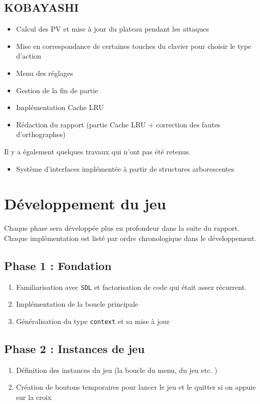 \documentclass{article}
\begin{document}
\subsection{KOBAYASHI}
\begin{itemize}
    \item Calcul des PV et mise à jour du plateau pendant les attaques 
    \item Mise en correspondance de certaines touches du clavier pour choisir le type d'action
    \item Menu des réglages 
    \item Gestion de la fin de partie
    \item Implémentation Cache LRU 
    \item Rédaction du rapport (partie Cache LRU + correction des fautes d'orthographes)
\end{itemize}

Il y a également quelques travaux qui n'ont pas été retenus.

\begin{itemize}
    \item Système d'interfaces implémentée à partir de structures arborescentes
    \
\end{itemize}


\section{Développement du jeu}
Chaque phase sera développée plus en profondeur dans la suite du rapport.
Chaque implémentation est listé par ordre chronologique dans le développement.

\subsection*{Phase 1 : Fondation}
\begin{enumerate}
    \item Familiarisation avec \texttt{SDL} et factorisation de code qui était assez récurrent.
    \item Implémentation de la boucle principale
    \item Généralisation du type \texttt{context} et sa mise à jour
\end{enumerate}

\subsection*{Phase 2 : Instances de jeu}
\begin{enumerate}
    \item Définition des instances du jeu (la boucle du menu, du jeu etc. )
    \item Création de boutons temporaires pour lancer le jeu et le quitter si on appuie sur la croix
\end{enumerate}
\end{document}
